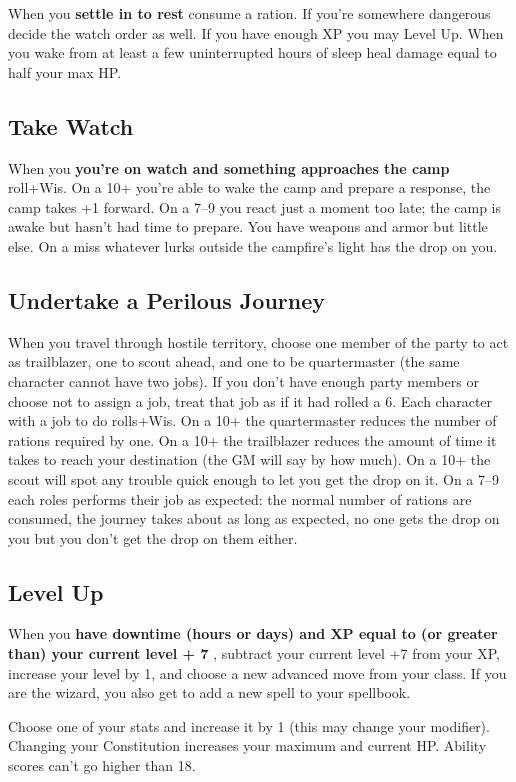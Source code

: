  When you \textbf{settle in to rest}
 consume a ration. If you're somewhere dangerous decide the watch order as well. If you have enough XP you may Level Up. When you wake from at least a few uninterrupted hours of sleep heal damage equal to half your max HP\@.
\subsection{Take Watch}


 When you \textbf{you're on watch and something approaches the camp}
 roll+Wis. On a 10+ you're able to wake the camp and prepare a response, the camp takes +1 forward. On a 7--9 you react just a moment too late; the camp is awake but hasn't had time to prepare. You have weapons and armor but little else. On a miss whatever lurks outside the campfire's light has the drop on you.
\subsection{Undertake a Perilous Journey}


 When you travel through hostile territory, choose one member of the party to act as trailblazer, one to scout ahead, and one to be quartermaster (the same character cannot have two jobs). If you don't have enough party members or choose not to assign a job, treat that job as if it had rolled a 6. Each character with a job to do rolls+Wis. On a 10+ the quartermaster reduces the number of rations required by one. On a 10+ the trailblazer reduces the amount of time it takes to reach your destination (the GM will say by how much). On a 10+ the scout will spot any trouble quick enough to let you get the drop on it. On a 7--9 each roles performs their job as expected: the normal number of rations are consumed, the journey takes about as long as expected, no one gets the drop on you but you don't get the drop on them either.
\subsection{Level Up}


 When you \textbf{have downtime (hours or days) and XP equal to (or greater than) your current level + 7}
, subtract your current level +7 from your XP, increase your level by 1, and choose a new advanced move from your class. If you are the wizard, you also get to add a new spell to your spellbook.


 Choose one of your stats and increase it by 1 (this may change your modifier). Changing your Constitution increases your maximum and current HP\@. Ability scores can't go higher than 18.

